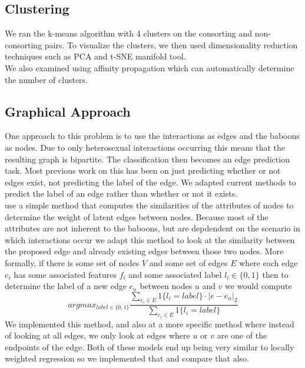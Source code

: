 \documentclass[twoside,twocolumn,paper=letter]{article}
\begin{document}
\subsection{Clustering}

We ran the k-means algorithm with 4 clusters on the consorting and
non-consorting pairs. To visualize the clusters, we then used dimensionality
reduction techniques such as PCA and t-SNE manifold tool.\\

We also examined using affinity propagation which can automatically determine
the number of clusters.

\subsection{Graphical Approach}

One approach to this problem is to use the interactions as edges and the baboons as nodes. Due to only heterosexual interactions occurring this means that the resulting graph is bipartite. The classification then becomes  an edge prediction task. Most previous work on this has been on just predicting whether or not edges exist, not predicting the label of the edge. We adapted current methods to predict the label of an edge rather than whether or not it exists. \\
\cite{Macskassy:2007} use a simple method that computes the similarities of the attributes of nodes to determine the weight of latent edges between nodes. Because most of the attributes are not inherent to the baboons, but are depdendent on the scenario in which interactions occur we adapt this method to look at the similarity between the proposed edge and already existing edges between those two nodes. More formally, if there is some set of nodes $V$ and some set of edges $E$ where each edge $e_i$ has some associated features $f_i$ and some associated label $l_i\in \{0,1\}$ then to determine the label of a new edge $e_n$ between nodes $u$ and $v$ we would compute 
$$argmax_{label \in \{0,1\}} \frac{\sum_{e_i \in E}1\{l_i=label\}\cdot|e-e_n|_2}{\sum_{e_i \in E}1\{l_i=label\}}$$
We implemented this method, and also at a more specific method where instead of looking at all edges, we only look at edges where $u$ or $v$ are one of the endpoints of the edge. Both of these models end up being very similar to locally weighted regression so we implemented that and compare that also. \\
\end{document}
